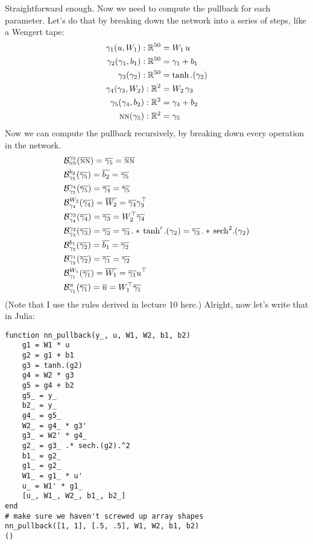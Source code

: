 \documentclass[11pt]{article}
\newcommand{\R}[0]{\mathbb{R}}
\newcommand{\B}[0]{\mathcal{B}}
\newcommand*\lgrad[1]{\overline{#1}}
\newcommand{\NN}[0]{\textsc{nn}}
\newcommand{\transpose}[1]{#1 ^\top}
\begin{document}
Straightforward enough.
Now we need to compute the pullback for each parameter. Let's do that by breaking down the network into a series of steps,
like a Wengert tape:
\begin{align*}
\gamma_1(u, W_1) : \R^{50} &= W_1 \, u \\
\gamma_2(\gamma_1, b_1) : \R^{50} &= \gamma_1 + b_1 \\
\gamma_3(\gamma_2) : \R^{50} &= \tanh.(\gamma_2) \\
\gamma_4(\gamma_3, W_2) : \R^2 &= W_2 \, \gamma_3 \\
\gamma_5(\gamma_4, b_2) : \R^2 &= \gamma_4 + b_2 \\
\NN(\gamma_5) : \R^2 &= \gamma_5
\end{align*}
Now we can compute the pullback recursively, by breaking down every operation in the network.
\begin{align*}
&\B^{\gamma_5}_{\NN}(\lgrad{\NN}) = \lgrad{\gamma_5} = \lgrad{\NN} \\
&\B^{b_2}_{\gamma_5}(\lgrad{\gamma_5}) = \lgrad{b_2} =  \lgrad{\gamma_5} \\
&\B^{\gamma_4}_{\gamma_5}(\lgrad{\gamma_5}) = \lgrad{\gamma_4} =  \lgrad{\gamma_5} \\
&\B^{W_2}_{\gamma_4}(\lgrad{\gamma_4}) = \lgrad{W_2} =  \lgrad{\gamma_4} \transpose{\gamma_3} \\
&\B^{\gamma_3}_{\gamma_4}(\lgrad{\gamma_4}) = \lgrad{\gamma_3} = \transpose{W_2} \lgrad{\gamma_4} \\
&\B^{\gamma_2}_{\gamma_3}(\lgrad{\gamma_3}) = \lgrad{\gamma_2} = \lgrad{\gamma_3} \, .* \, \tanh'.(\gamma_2) = \lgrad{\gamma_3} \, .* \, \mathrm{sech}^2.(\gamma_2)\\
&\B^{b_1}_{\gamma_2}(\lgrad{\gamma_2}) = \lgrad{b_1} = \lgrad{\gamma_2}\\
&\B^{\gamma_1}_{\gamma_2}(\lgrad{\gamma_2}) = \lgrad{\gamma_1} = \lgrad{\gamma_2}\\
&\B^{W_1}_{\gamma_1}(\lgrad{\gamma_1}) = \lgrad{W_1} = \lgrad{\gamma_1} \transpose{u}\\
&\B^{u}_{\gamma_1}(\lgrad{\gamma_1}) = \lgrad{u} = \transpose{W_1} \lgrad{\gamma_1}
\end{align*}
(Note that I use the rules derived in lecture 10 here.)
Alright, now let's write that in Julia:
\begin{verbatim}
function nn_pullback(y_, u, W1, W2, b1, b2)
    g1 = W1 * u
    g2 = g1 + b1
    g3 = tanh.(g2)
    g4 = W2 * g3
    g5 = g4 + b2
    g5_ = y_
    b2_ = y_
    g4_ = g5_
    W2_ = g4_ * g3'
    g3_ = W2' * g4_
    g2_ = g3_ .* sech.(g2).^2
    b1_ = g2_
    g1_ = g2_
    W1_ = g1_ * u'
    u_ = W1' * g1_
    [u_, W1_, W2_, b1_, b2_]
end
# make sure we haven't screwed up array shapes
nn_pullback([1, 1], [.5, .5], W1, W2, b1, b2)
()
\end{verbatim}
\end{document}
